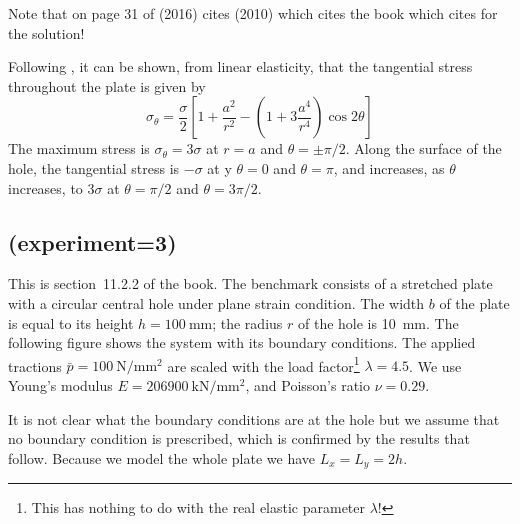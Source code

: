 Note that on page 31 of \textcite{rama16} (2016) cites \textcite{chnn10} (2010)
which cites the book \cite[p772]{yobu02} which cites \textcite{budynas} for the solution!

Following \cite{yobu02}, it can be shown, from linear elasticity, that the tangential
stress throughout the plate is given by
\[
\sigma_\theta = \frac{\sigma}{2} \left[ 1+\frac{a^2}{r^2} - 
\left( 1+3\frac{a^4}{r^4}  \right) \cos 2\theta   \right]
\]
The maximum stress is $\sigma_\theta=3\sigma$ at $r=a$ and $\theta=\pm \pi/2$. Along the surface of the hole, 
the tangential stress is $-\sigma$ at y $\theta=0$  and $\theta=\pi$, 
and increases, as $\theta$ increases, to $3\sigma$ at $\theta=\pi/2$ and $\theta=3\pi/2$.



























\newpage
\subsection*{\textcite{rarr03} (experiment=3)}

This is section~11.2.2 of the book.
The benchmark consists of a stretched plate with a circular central hole under plane strain condition. 
The width $b$ of the plate is 
equal to its height $h = \SI{100}{\mm}$; the radius $r$ of the hole is \SI{10}{\mm}. 
The following figure shows the system with its boundary conditions. The applied tractions 
$\bar{p} = \SI{100}{\newton\per\square\mm}$ are scaled with the load factor\footnote{This has 
nothing to do with the real elastic parameter $\lambda$!} $\lambda=4.5$.
We use Young's modulus $E = \SI{206 900}{\kilo\newton\per\square\mm}$, and Poisson's ratio $\nu = 0.29$.

It is not clear what the boundary conditions are at the hole but we assume that no boundary
condition is prescribed, which is confirmed by the results that follow.
Because we model the whole plate we have $L_x=L_y=2h$.

